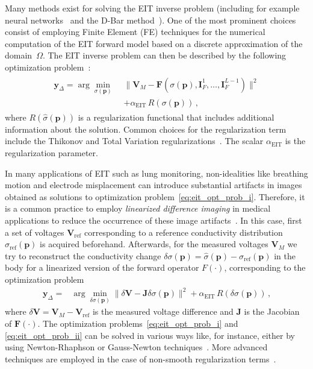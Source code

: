 \documentclass[10pt]{IEEEtran}
\newcommand{\vs}{\mathbf{s}}
\newcommand{\vp}{\mathbf{\textstyle{p}}}
\newcommand{\vx}{\mathbf{x}}
\newcommand{\vy}{\mathbf{y}}
\begin{document}
Many methods exist for solving the EIT inverse problem (including for example neural networks~\cite{adler1994neural} and the D-Bar method~\cite{isaacson2004Dbar}).
%
One of the most prominent choices consist of employing Finite Element (FE) techniques for the numerical computation of the EIT forward model based on a discrete approximation of the domain~$\Omega$.
%
The EIT inverse problem can then be described 
by the following optimization problem~\cite{Holder04}:
%
\begin{align} \label{eq:eit_opt_prob_i}
\begin{split}
    \vy_{\Delta} {}={} 
    \arg\min_{{\sigma}(\vp)} \,\,
    & \big\|\mathbf{V}_M-\mathbf{F}({\sigma}(\vp),\mathbf{I}_F^1,\ldots,\mathbf{I}_F^{L-1})\big\|^2
    \\ & 
    + \alpha_{\text{EIT}} \, R({\sigma}(\vp))
    \,\text{,}
\end{split}
\end{align}
where $R(\hat{\sigma}(\vp))$ is a regularization functional that includes additional information about the solution. Common choices for the regularization term include the Thikonov and Total Variation regularizations~\cite{borsic2010invivoTV,Holder04}. The scalar $\alpha_{\text{EIT}}$ is the regularization parameter.


In many applications of EIT such as lung monitoring, non-idealities like breathing motion and electrode misplacement can introduce substantial artifacts in images obtained as solutions to optimization problem~\eqref{eq:eit_opt_prob_i}.
%
Therefore, it is a common practice to employ \textit{linearized difference imaging} in medical applications to reduce the occurrence of these image artifacts~\cite{Holder04}.
%
In this case, first a set of voltages $\mathbf{V}_{\text{ref}}$ corresponding to a reference conductivity distribution $\sigma_{\text{ref}}(\vp)$ is acquired beforehand. Afterwards, for the measured voltages $\mathbf{V}_M$ we try to reconstruct the conductivity change $\delta{\sigma}(\vp)=\hat{\sigma}(\vp)-\sigma_{\text{ref}}(\vp)$ in the body for a linearized version of the forward operator $F(\cdot)$, corresponding to the optimization problem
\begin{align} \label{eq:eit_opt_prob_ii}
    \vy_{\Delta} {}={} &
    \arg\min_{\delta{\sigma}(\vp)}
    \|\delta\mathbf{V}-\mathbf{J} \delta{\sigma}(\vp)\|^2 
    + \alpha_{\text{EIT}} \, R(\delta {\sigma}(\vp))
    \,\text{,}
\end{align}
where $\delta\mathbf{V}=\mathbf{V}_M-\mathbf{V}_{\text{ref}}$ is the measured voltage difference and $\mathbf{J}$ is the Jacobian of $\mathbf{F}(\cdot)$.
%
The optimization problems~\eqref{eq:eit_opt_prob_i} and \eqref{eq:eit_opt_prob_ii} can be solved in various ways like, for instance, either by using Newton-Rhaphson or Gauss-Newton techniques~\cite{Holder04}. More advanced techniques are employed in the case of non-smooth regularization terms~\cite{borsic2010invivoTV}.
\end{document}
